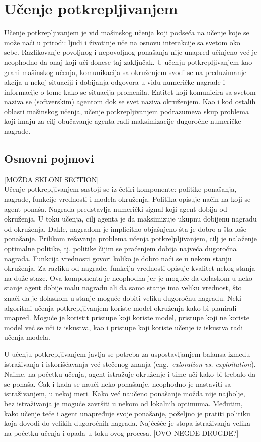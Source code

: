 \chapter{Učenje potkrepljivanjem}
\label{ch:rl}

Učenje potkrepljivanjem je vid mašinskog učenja koji podseća na učenje koje se može naći u prirodi: ljudi i životinje uče na osnovu interakcije sa svetom oko sebe. Razlikovanje povoljnog i nepovoljnog ponašanja nije unapred učinjeno već je neophodno da onaj koji uči donese taj zaključak. U učenju potkrepljivanjem kao grani mašinskog učenja, komunikacija sa okruženjem svodi se na preduzimanje akcija u nekoj situaciji i dobijanja odgovora u vidu numeričke nagrade i informacije o tome kako se situacija promenila. Entitet koji komunicira sa svetom naziva se (softverskim) agentom dok se svet naziva okruženjem. Kao i kod ostalih oblasti mašinskog učenja, učenje potkrepljivanjem podrazumeva skup problema koji imaju za cilj obučavanje agenta radi maksimizacije dugoročne numeričke nagrade. 

\section{Osnovni pojmovi}
[MOŽDA SKLONI SECTION] \\
Učenje potkrepljivanjem sastoji se iz četiri komponente: politike ponašanja, nagrade, funkcije vrednosti i modela okruženja. Politika opisuje način na koji se agent ponaša. Nagrada predstavlja numerički signal koji agent dobija od okruženja. U toku učenja, cilj agenta je da maksimizuje ukupnu dobijenu nagradu od okruženja. Dakle, nagradom je implicitno objašnjeno šta je dobro a šta loše ponašanje. Prilikom rešavanja problema učenja potkrelpljivanjem, cilj je nalaženje optimalne politike, tj. politike čijim se praćenjem dobija najveća dugoročna nagrada. Funkcija vrednosti govori koliko je dobro naći se u nekom stanju okruženja. Za razliku od nagrade, funkcija vrednosti opisuje kvalitet nekog stanja na duže staze. Ova komponenta je neophodna jer je moguće da dolaskom u neko stanje agent dobije malu nagradu ali da samo stanje ima veliku vrednost, što znači da je dolaskom u stanje moguće dobiti veliku dugoročnu nagradu. Neki algoritmi učenja potkrepljivanjem koriste model okruženja kako bi planirali unapred. Moguće je koristit pristupe koji koriste model, pristupe koji ne koriste model već se uči iz iskustva, kao i pristupe koji koriste učenje iz iskustva radi učenja modela.
\par 
U učenju potkrepljivanjem javlja se potreba za uspostavljanjem balansa između istraživanja i iskorišćavanja već stečenog znanja (eng.~{\em exloration vs. exploitation}). Naime, na početku učenja, agent istražuje okruženje i time uči kako bi trebalo da se ponaša. Čak i kada se nauči neko ponašanje, neophodno je nastaviti sa istraživanjem, u nekoj meri. Kako već naučeno ponašanje možda nije najbolje, bez istraživanja je moguće završiti u nekom od lokalnih optimuma. Međutim, kako učenje teče i agent unapređuje svoje ponašanje, poželjno je pratiti politiku koja dovodi do velikih dugoročnih nagrada. Najčešće je stopa istraživanja velika na početku učenja i opada u toku ovog procesa. [OVO NEGDE DRUGDE?]

